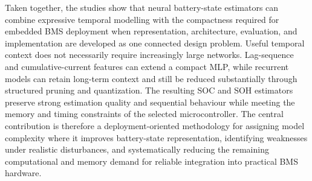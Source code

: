 \documentclass[
    a4paper,
    12pt,
    titlepage,
    bibliography=totoc,
    twoside=on,
    parskip=false,
    numbers=noenddot,
    cleardoublepage=empty,
    DIV=12,
    BCOR=12.0mm,
    headheight=36pt,
    headings=openright
]{scrreprt}
\begin{document}
Taken together, the studies show that neural battery-state estimators can combine expressive temporal modelling with the compactness required for embedded BMS deployment when representation, architecture, evaluation, and implementation are developed as one connected design problem. Useful temporal context does not necessarily require increasingly large networks. Lag-sequence and cumulative-current features can extend a compact MLP, while recurrent models can retain long-term context and still be reduced substantially through structured pruning and quantization. The resulting SOC and SOH estimators preserve strong estimation quality and sequential behaviour while meeting the memory and timing constraints of the selected microcontroller. The central contribution is therefore a deployment-oriented methodology for assigning model complexity where it improves battery-state representation, identifying weaknesses under realistic disturbances, and systematically reducing the remaining computational and memory demand for reliable integration into practical BMS hardware.

\tableofcontents
\cleardoublepage
\end{document}
